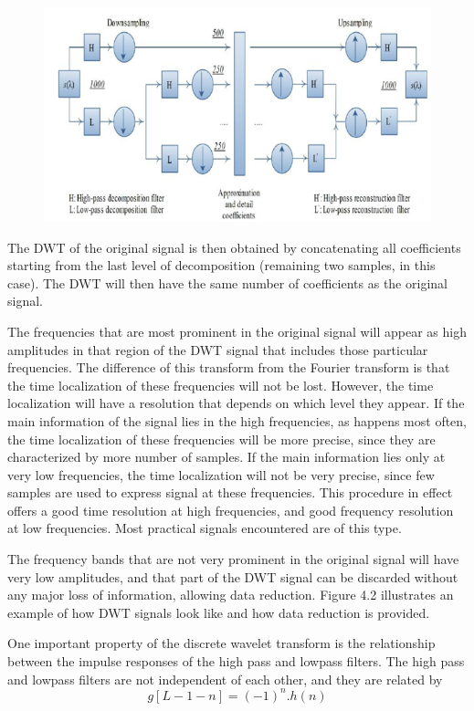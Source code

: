 \documentclass[12pt, a4paper, twoside]{report}
\begin{document}
\begin{figure}[!h]
	\centering
	\includegraphics[width=.8\textwidth]
	{images/chapter3/subband-algorithm-3}
	\caption{}
	\label{fig:subband-algorithm-3}
\end{figure}

The DWT of the original signal is then obtained by concatenating all coefficients starting from the last level of decomposition (remaining two samples, in this case). The DWT will then have the same number of coefficients as the original signal. 
\par
The frequencies that are most prominent in the original signal will appear as high amplitudes in that region of the DWT signal that includes those particular frequencies. The difference of this transform from the Fourier transform is that the time localization of these frequencies will not be lost. However, the time localization will have a resolution that depends on which level they appear. If the main information of the signal lies in the high frequencies, as happens most often, the time localization of these frequencies will be more precise, since they are characterized by more number of samples. If the main information lies only at very low frequencies, the time localization will not be very precise, since few samples are used to express signal at these frequencies. This procedure in effect offers a good time resolution at high frequencies, and good frequency resolution at low frequencies. Most practical signals encountered are of this type. 
\par
The frequency bands that are not very prominent in the original signal will have very low amplitudes, and that part of the DWT signal can be discarded without any major loss of information, allowing data reduction. Figure 4.2 illustrates an example of how DWT signals look like and how data reduction is provided.
\par
One important property of the discrete wavelet transform is the relationship between the impulse responses of the high pass and lowpass filters. The high pass and lowpass filters are not independent of each other, and they are related by
\begin{equation*}
g[L-1-n] = (-1)^n .h(n)
\end{equation*}
\end{document}
